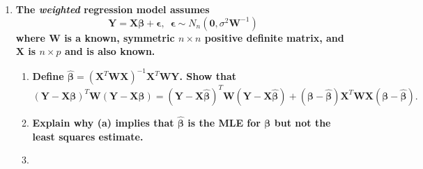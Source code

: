 \documentclass[11pt]{article}
\newenvironment{solution}
  {\renewcommand\qedsymbol{$\blacksquare$}\begin{proof}[Solution]}
  {\end{proof}}
\begin{document}
\begin{enumerate}
    \begin{solution}
    For families in the 90th percentile of income, we expect the proportionto be at or above the
    90th percentile of consumption to be  
    This follows from the fact that the relation of family income to consumption is positive and roughly linear, so
    we expect families with higher incomes to have higher levels of consumption.

    \end{solution}
   
    \item \textbf{The \textit{weighted} regression model assumes}
    \[
      \bm{Y} = \bm{X\beta} + \bm{\epsilon}, \, \, \, \bm{\epsilon} \sim N_n(\bm{0}, \sigma^{2}\bm{W}^{-1})
    \]
    \textbf{where $\bm{W}$ is a known, symmetric $n \times n$ positive definite matrix, and $\bm{X}$ is $n \times p$ and is also known.}

    \begin{enumerate}
      \item \textbf{Define $\hat{\bm{\beta}} = (\bm{X}^T \bm{WX})^{-1} \bm{X}^T \bm{WY}$. Show that}
      \[
        (\bm{Y} - \bm{X\beta})^T\bm{W}(\bm{Y} - \bm{X\beta}) = (\bm{Y} - \bm{X}\hat{\bm{\beta}})^T\bm{W}(\bm{Y} - \bm{X\hat{\bm{\beta}}}) + (\bm{\beta} - \hat{\bm{\beta}})\bm{X}^T\bm{WX}(\bm{\beta} - \hat{\bm{\beta}}).
      \]
      \item \textbf{Explain why (a) implies that $\hat{\bm{\beta}}$ is the MLE for $\bm{\beta}$ but not the least squares estimate.}
      \item 
    \end{enumerate}
\end{enumerate}
\end{document}

